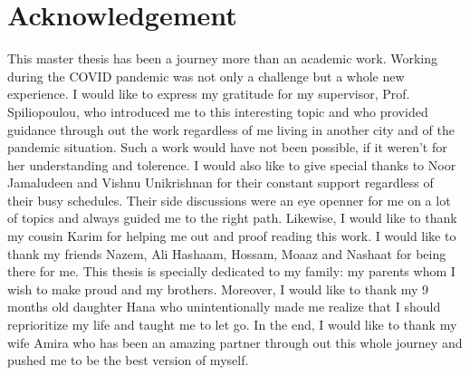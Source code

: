 \section*{Acknowledgement}
\thispagestyle{empty}
This master thesis has been a journey more than an academic work. Working during the COVID pandemic was not only a challenge but a whole new experience.
I would like to express my gratitude for my supervisor, Prof. Spiliopoulou, who introduced me to this interesting topic and who provided guidance through out the work
regardless of me living in another city and of the pandemic situation. Such a work would have not been possible, if it weren't for her understanding and tolerence.
I would also like to give special thanks to Noor Jamaludeen and Vishnu Unikrishnan for their constant support regardless of their busy schedules.
Their side discussions were an eye openner for me on a lot of topics and always guided me to the right path.
Likewise, I would like to thank my cousin Karim for helping me out and proof reading this work.
I would like to thank my friends Nazem, Ali Hashaam, Hossam, Moaaz and Nashaat for being there for me.
This thesis is specially dedicated to my family: my parents whom I wish to make proud and my brothers.
Moreover, I would like to thank my 9 months old daughter Hana who unintentionally made me realize that I should reprioritize my life and taught me to let go.
In the end, I would like to thank my wife Amira who has been an amazing partner through out this whole journey and pushed me to be the best version of myself.


\null\newpage
\thispagestyle{empty}


